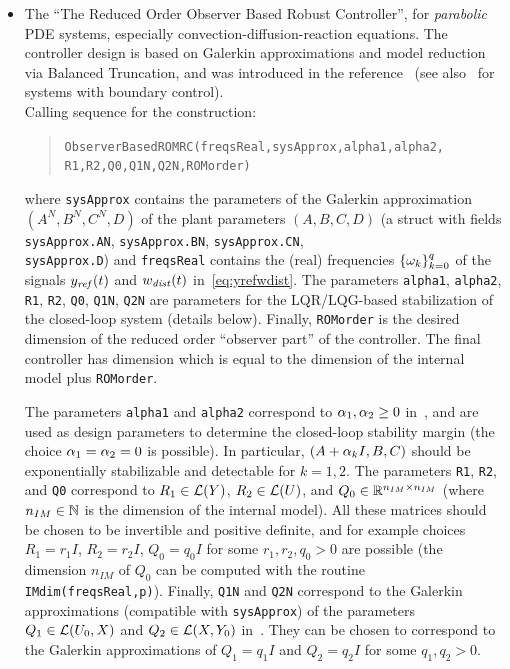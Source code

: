 \documentclass[11pt, a4paper]{amsart}
\theoremstyle{definition}
\numberwithin{equation}{section}
\newcommand{\yref}{y_{\mbox{\scriptsize\textit{ref}}}}
\newcommand{\wdist}{w_{\mbox{\scriptsize\textit{dist}}}}
\begin{document}
\begin{itemize}
     \bigskip
     
\item 
The ``The Reduced Order Observer Based Robust Controller'', for \emph{parabolic} PDE systems, especially convection-diffusion-reaction equations. The controller design is based on Galerkin approximations and model reduction via Balanced Truncation, and was introduced in the reference~\cite{PauPha20} (see also~\cite{PhaPau21} for systems with boundary control).\\[1ex]
      Calling sequence for the construction:\\[-1ex]
     \begin{quotation}
       \hspace{-1cm}\texttt{ObserverBasedROMRC(freqsReal,sysApprox,alpha1,alpha2,\\ 
	 \phantom{a}\hspace{3.0cm} R1,R2,Q0,Q1N,Q2N,ROMorder)}
     \end{quotation}
     \medskip
     where \texttt{sysApprox} contains the parameters of the Galerkin approximation $(A^N,B^N,C^N,D)$ of the plant parameters $(A,B,C,D)$ (a struct with fields \texttt{sysApprox.AN}, \texttt{sysApprox.BN}, \texttt{sysApprox.CN}, \\ \texttt{sysApprox.D}) and \texttt{freqsReal} contains the (real) frequencies $\{\omega_k\}_{k=0}^q$ of the signals $\yref(t)$ and $\wdist(t)$ in~\eqref{eq:yrefwdist}.
The parameters \texttt{alpha1}, \texttt{alpha2},
\texttt{R1}, \texttt{R2}, \texttt{Q0}, \texttt{Q1N}, \texttt{Q2N} are parameters for the LQR/LQG-based stabilization of the closed-loop system (details below). Finally, \texttt{ROMorder} is the desired dimension of the reduced order ``observer part'' of the controller. The final controller has dimension which is equal to the dimension of the internal model plus \texttt{ROMorder}.

The parameters \texttt{alpha1} and \texttt{alpha2} correspond to $\alpha_1,\alpha_2\geq 0$ in~, and are used as design parameters to determine the closed-loop stability margin (the choice $\alpha_1=\alpha_2=0$ is possible). In particular, $(A+\alpha_k I,B,C)$ should be exponentially stabilizable and detectable for $k=1,2$.
The parameters 
\texttt{R1}, \texttt{R2}, and \texttt{Q0} correspond to $R_1\in {\mathcal{L}}(Y)$, $R_2\in {\mathcal{L}}(U)$, and $Q_0\in {\mathbb{R}}^{n_{IM}\times n_{IM}}$ (where $n_{IM}\in {\mathbb{N}}$ is the dimension of the internal model). All these matrices should be chosen to be invertible and positive definite, and for example choices $R_1=r_1 I$, $R_2=r_2 I$, $Q_0=q_0 I$ for some $r_1,r_2,q_0>0$ are possible
 (the dimension $n_{IM}$ of $Q_0$ can be computed with the routine \texttt{IMdim(freqsReal,p)}). Finally,
\texttt{Q1N} and \texttt{Q2N} correspond to  the Galerkin approximations (compatible with \texttt{sysApprox}) of the parameters $Q_1\in {\mathcal{L}}(U_0,X)$ and $Q_2\in {\mathcal{L}}(X,Y_0)$ in~. They
can be chosen to correspond to the Galerkin approximations of $Q_1=q_1 I$ and $Q_2=q_2 I$ for some  $q_1,q_2>0$.


\end{itemize}
\end{document}
